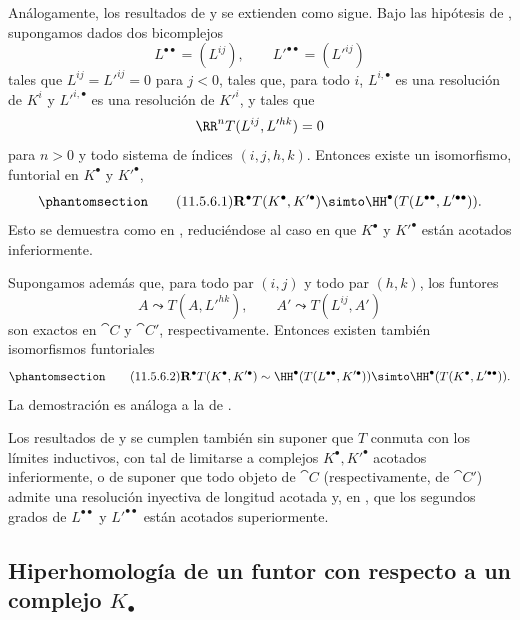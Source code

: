 \documentclass[oneside]{amsart}
\let\EGAOriginalLabel\label
\renewcommand{\label}[1]{\phantomsection\EGAOriginalLabel{#1}}
\begin{document}
\begin{env}[11.5.6]
\label{0.11.5.6}
Análogamente, los resultados de  y  se extienden como sigue.
Bajo las hipótesis de , supongamos dados dos bicomplejos
\[
  L^{\bullet\bullet}=(L^{ij}),\qquad
  L'^{\bullet\bullet}=(L'^{ij})
\]
tales que $L^{ij}=L'^{ij}=0$ para $j<0$, tales que, para todo $i$, $L^{i,\bullet}$ es una resolución de $K^i$ y $L'^{i,\bullet}$ es una resolución de $K'^i$, y tales que
\[
  \RR^nT(L^{ij},L'^{hk})=0
\]
para $n>0$ y todo sistema de índices $(i,j,h,k)$.
Entonces existe un isomorfismo, funtorial en $K^\bullet$ y $K'^\bullet$,
\[
\label{0.11.5.6.1}
\tag{11.5.6.1}
  \mathbf{R}^\bullet T(K^\bullet,K'^\bullet)
  \simto
  \HH^\bullet(T(L^{\bullet\bullet},L'^{\bullet\bullet})).
\]
Esto se demuestra como en , reduciéndose al caso en que $K^\bullet$ y $K'^\bullet$ están acotados inferiormente.

Supongamos además que, para todo par $(i,j)$ y todo par $(h,k)$, los funtores
\[
  A\leadsto T(A,L'^{hk}),
  \qquad
  A'\leadsto T(L^{ij},A')
\]
son exactos en $\cat{C}$ y $\cat{C}'$, respectivamente.
Entonces existen también isomorfismos funtoriales
\[
\label{0.11.5.6.2}
\tag{11.5.6.2}
  \mathbf{R}^\bullet T(K^\bullet,K'^\bullet)
  \sim
  \HH^\bullet(T(L^{\bullet\bullet},K'^\bullet))
  \simto
  \HH^\bullet(T(K^\bullet,L'^{\bullet\bullet})).
\]
La demostración es análoga a la de .
\end{env}

\begin{env}[11.5.7]
\label{0.11.5.7}
Los resultados de  y  se cumplen también sin suponer que $T$ conmuta con los límites inductivos, con tal de limitarse a complejos $K^\bullet,K'^\bullet$ acotados inferiormente, o de suponer que todo objeto de $\cat{C}$ (respectivamente, de $\cat{C}'$) admite una resolución inyectiva de longitud acotada y, en , que los segundos grados de $L^{\bullet\bullet}$ y $L'^{\bullet\bullet}$ están acotados superiormente.
\end{env}

\subsection{Hiperhomología de un funtor con respecto a un complejo $K_{\bullet}$}
\label{subsection:0.11.6}
\end{document}
